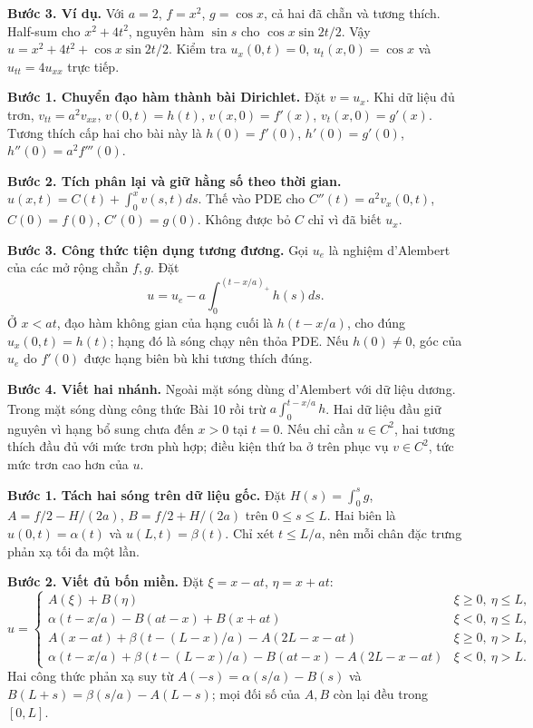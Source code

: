 \textbf{Bước 3. Ví dụ.} Với $a=2$, $f=x^2$, $g=\cos x$, cả hai đã chẵn và tương thích. Half-sum cho $x^2+4t^2$, nguyên hàm $\sin s$ cho $\cos x\sin2t/2$. Vậy $u=x^2+4t^2+\cos x\sin2t/2$. Kiểm tra $u_x(0,t)=0$, $u_t(x,0)=\cos x$ và $u_{tt}=4u_{xx}$ trực tiếp.

\textbf{Bước 1. Chuyển đạo hàm thành bài Dirichlet.} Đặt $v=u_x$. Khi dữ liệu đủ trơn, $v_{tt}=a^2v_{xx}$, $v(0,t)=h(t)$, $v(x,0)=f'(x)$, $v_t(x,0)=g'(x)$. Tương thích cấp hai cho bài này là $h(0)=f'(0)$, $h'(0)=g'(0)$, $h''(0)=a^2f'''(0)$.

\textbf{Bước 2. Tích phân lại và giữ hằng số theo thời gian.} $u(x,t)=C(t)+\int_0^xv(s,t)ds$. Thế vào PDE cho $C''(t)=a^2v_x(0,t)$, $C(0)=f(0)$, $C'(0)=g(0)$. Không được bỏ $C$ chỉ vì đã biết $u_x$.

\textbf{Bước 3. Công thức tiện dụng tương đương.} Gọi $u_e$ là nghiệm d'Alembert của các mở rộng chẵn $f,g$. Đặt
\[u=u_e-a\int_0^{(t-x/a)_+}h(s)ds.\]
Ở $x<at$, đạo hàm không gian của hạng cuối là $h(t-x/a)$, cho đúng $u_x(0,t)=h(t)$; hạng đó là sóng chạy nên thỏa PDE. Nếu $h(0)\ne0$, góc của $u_e$ do $f'(0)$ được hạng biên bù khi tương thích đúng.

\textbf{Bước 4. Viết hai nhánh.} Ngoài mặt sóng dùng d'Alembert với dữ liệu dương. Trong mặt sóng dùng công thức Bài 10 rồi trừ $a\int_0^{t-x/a}h$. Hai dữ liệu đầu giữ nguyên vì hạng bổ sung chưa đến $x>0$ tại $t=0$. Nếu chỉ cần $u\in C^2$, hai tương thích đầu đủ với mức trơn phù hợp; điều kiện thứ ba ở trên phục vụ $v\in C^2$, tức mức trơn cao hơn của $u$.

\textbf{Bước 1. Tách hai sóng trên dữ liệu gốc.} Đặt $H(s)=\int_0^sg$, $A=f/2-H/(2a)$, $B=f/2+H/(2a)$ trên $0\le s\le L$. Hai biên là $u(0,t)=\alpha(t)$ và $u(L,t)=\beta(t)$. Chỉ xét $t\le L/a$, nên mỗi chân đặc trưng phản xạ tối đa một lần.

\textbf{Bước 2. Viết đủ bốn miền.} Đặt $\xi=x-at$, $\eta=x+at$:
\[u=\begin{cases}
A(\xi)+B(\eta)&\xi\ge0,\ \eta\le L,\\
\alpha(t-x/a)-B(at-x)+B(x+at)&\xi<0,\ \eta\le L,\\
A(x-at)+\beta(t-(L-x)/a)-A(2L-x-at)&\xi\ge0,\ \eta>L,\\
\alpha(t-x/a)+\beta(t-(L-x)/a)-B(at-x)-A(2L-x-at)&\xi<0,\ \eta>L.
\end{cases}\]
Hai công thức phản xạ suy từ $A(-s)=\alpha(s/a)-B(s)$ và $B(L+s)=\beta(s/a)-A(L-s)$; mọi đối số của $A,B$ còn lại đều trong $[0,L]$.

